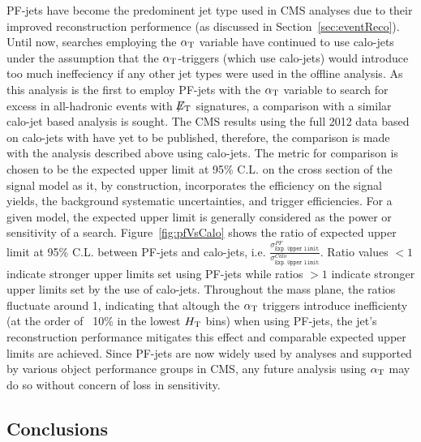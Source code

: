 PF-jets have become the predominent jet type used in CMS analyses due to their 
improved reconstruction performence (as discussed in Section~\ref{sec:eventReco}). 
Until now, searches employing the $\alpha_{\text{T}}$ variable have continued to use calo-jets 
under the assumption that the $\alpha_{\text{T}}$-triggers (which use calo-jets) would 
introduce too much ineffeciency if any other jet types were used in the offline analysis. 
As this analysis is the first to employ PF-jets with the $\alpha_{\text{T}}$ variable to search
for excess in all-hadronic events with $\mbox{$\not\!\!E_\text{T}$}$ signatures, a comparison with a similar 
calo-jet based analysis is sought. The CMS results using the full 2012 data based on 
calo-jets with have yet to be published, therefore, the comparison is made with 
the analysis described above using calo-jets. The metric for comparison is chosen to 
be the expected upper limit at 95\% C.L. on the cross section of the signal model  
as it, by construction, incorporates the efficiency on the signal yields, the background systematic 
uncertainties, and trigger efficiencies. For a given model, the expected upper limit is generally 
considered as the power or sensitivity of a search. Figure~\ref{fig:pfVsCalo} shows the ratio
of expected upper limit at 95\% C.L. between PF-jets and calo-jets, i.e. 
$\frac{\sigma_{\texttt{Exp. Upper limit}}^{PF}}{\sigma_{\texttt{Exp. Upper limit}}^{Calo}}$.
Ratio values $<1$ indicate stronger upper limits set using PF-jets while ratios $>1$ indicate
stronger upper limits set by the use of calo-jets. Throughout the mass plane, the ratios fluctuate
around 1, indicating that altough the $\alpha_{\text{T}}$ triggers introduce inefficienty (at the order of ~10\% 
in the lowest $\mbox{$H_\text{T}$}$ bins) when using PF-jets, the jet's reconstruction performance mitigates 
this effect and comparable expected upper limits are achieved. Since PF-jets are now widely used by analyses
and supported by various object performance groups in CMS, any future analysis using $\alpha_{\text{T}}$ may do
so without concern of loss in sensitivity.  


\FloatBarrier

\subsection{Conclusions}


